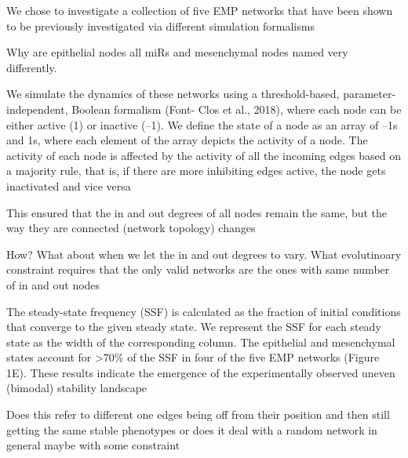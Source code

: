 \documentclass{article}
\begin{document}
\begin{tcolorbox}[colback=yellow!5!white,colframe=yellow!50!black,
  colbacktitle=yellow!75!black,title= ]
  We chose to investigate a collection of five EMP networks that have been shown to be previously investigated
via different simulation formalisms   
\end{tcolorbox}

Why are epithelial nodes all miRs and mesenchymal nodes named very differently. 


\begin{tcolorbox}[colback=yellow!5!white,colframe=yellow!50!black,
  colbacktitle=yellow!75!black,title= ]
  We simulate
the dynamics of these networks using a threshold-based, parameter-independent, Boolean formalism
(Font- Clos et al., 2018), where each node can be either active (1) or inactive (–1). We define the state
of a node as an array of –1s and 1s, where each element of the array depicts the activity of a node. The
activity of each node is affected by the activity of all the incoming edges based on a majority rule, that
is, if there are more inhibiting edges active, the node gets inactivated and vice versa 
  
\end{tcolorbox}


\begin{tcolorbox}[colback=yellow!5!white,colframe=yellow!50!black,
  colbacktitle=yellow!75!black,title= ]
This ensured that the in and out degrees of all nodes remain the same,
but the way they are connected (network topology) changes  
  
\end{tcolorbox}
How?
What about when we let the in and out degrees to vary. What evolutinoary constraint requires that the only valid networks are the ones with same number of in and out nodes 


\begin{tcolorbox}[colback=yellow!5!white,colframe=yellow!50!black,
  colbacktitle=yellow!75!black,title= ]
  The steady-state frequency (SSF) is calculated
as the fraction of initial conditions that converge to the given steady state. We represent the SSF for
each steady state as the width of the corresponding column. The epithelial and mesenchymal states
account for >70\% of the SSF in four of the five EMP networks (Figure 1E). These results indicate the
emergence of the experimentally observed uneven (bimodal) stability landscape
  
\end{tcolorbox}
Does this refer to different one edges being off from their position and then still getting the same stable phenotypes or does it deal with a random network in general maybe with some constraint
\end{document}
